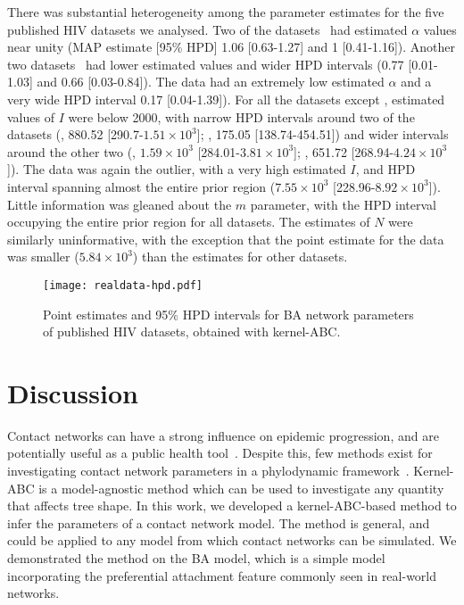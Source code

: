 \documentclass[12pt]{article}\usepackage[]{graphicx}\usepackage[]{color}
\begin{document}
There was substantial heterogeneity among the parameter estimates for the five
published HIV datasets we analysed. Two of the
datasets~\autocite{niculescu2015recent, wang2015targeting} had estimated
$\alpha$ values near unity (\gls{MAP} estimate [95\% \gls{HPD}] 
  1.06 
  [0.63-1.27]
and
  1 
  [0.41-1.16]). Another two
datasets~\autocite{li2015hiv, cuevas2009hiv} had lower estimated values and wider
\gls{HPD} intervals
  (0.77 
  [0.01-1.03]
and
  0.66 
  [0.03-0.84]). 
The \textcite{novitsky2014impact} data had an extremely low estimated $\alpha$
and a very wide \gls{HPD} interval
  0.17 
  [0.04-1.39]). 
For all the datasets except \textcite{novitsky2014impact}, estimated values of
$I$ were below 2000, with narrow \gls{HPD} intervals around two of the
datasets
  (\textcite{cuevas2009hiv}, 880.52 
  [290.7-\ensuremath{1.51\times 10^{3}}];
   \textcite{niculescu2015recent}, 175.05
  [138.74-454.51])
and wider intervals around the other two
  (\textcite{li2015hiv}, \ensuremath{1.59\times 10^{3}} 
  [284.01-\ensuremath{3.81\times 10^{3}}];
   \textcite{wang2015targeting}, 651.72
  [268.94-\ensuremath{4.24\times 10^{3}}]).
The \textcite{novitsky2014impact} data was again the outlier, with a very high
estimated $I$, and \gls{HPD} interval spanning almost the entire prior region
  (\ensuremath{7.55\times 10^{3}} 
  [228.96-\ensuremath{8.92\times 10^{3}}]).
Little information was gleaned about the $m$ parameter, with the \gls{HPD}
interval occupying the entire prior region for all datasets. The estimates of
$N$ were similarly uninformative, with the exception that the point estimate
for the \textcite{wang2015targeting} data was smaller
  (\ensuremath{5.84\times 10^{3}})
than the estimates for other datasets.

\begin{figure}[ht]
  \centering
  \texttt{[image: realdata-hpd.pdf]}
  \caption{
    Point estimates and 95\% \gls{HPD} intervals for \gls{BA} network
    parameters of published HIV datasets, obtained with kernel-ABC.
  }
  \label{fig:abchpd}
\end{figure}

\section*{Discussion}

Contact networks can have a strong influence on epidemic progression, and are
potentially useful as a public health tool~\autocite{wang2015targeting,
little2014using}. Despite this, few methods exist for investigating contact
network parameters in a phylodynamic framework~\autocite{groendyke2011bayesian,
brown2011transmission}. Kernel-ABC is a model-agnostic method which can be used
to investigate any quantity that affects tree shape. In this work, we developed
a kernel-ABC-based method to infer the parameters of a contact network model.
The method is general, and could be applied to any model from which contact
networks can be simulated. We demonstrated the method on the \gls{BA} model,
which is a simple model incorporating the preferential attachment feature
commonly seen in real-world networks. 
\end{document}

